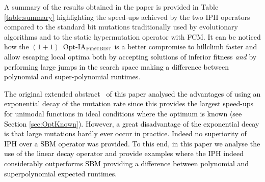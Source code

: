 \documentclass[lettersize,journal]{IEEEtran}
\newcommand{\new}[1]{\textcolor{black}{#1}}
\begin{document}


A summary of the results obtained in the paper is provided in Table \ref{table:summary} highlighting the speed-ups achieved by the two IPH operators compared to the standard bit mutations traditionally  used by evolutionary algorithms and to the static hypermutation operator with FCM.
\new{It can be noticed how the $(1+1)$~Opt-IA$_{\textsc{FirstBest}}$ is a better compromise to hillclimb faster and allow escaping local optima both by accepting solutions of inferior fitness {\it and} by performing large jumps in the search space making a difference between polynomial and super-polynomial runtimes.}

\new{The original extended abstract~\cite{CorusOlivetoYazdaniIPH2019} of this paper analysed the advantages of using an exponential decay of the mutation rate since this provides the largest speed-ups for unimodal functions in ideal conditions where the optimum is known (see Section \ref{sec:OptKnown}). However, a great disadvantage of the exponential decay is that large mutations hardly ever occur in practice. Indeed no superiority of IPH over a SBM operator was provided.  To this end, in this paper we analyse the use of the linear decay operator and  provide examples where the IPH indeed considerably outperforms SBM providing a difference between polynomial and superpolynomial expected runtimes.}
\end{document}
